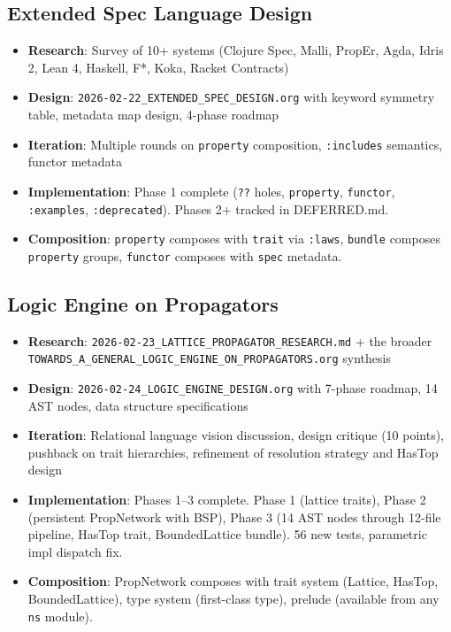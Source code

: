 \documentclass[11pt]{article}
\begin{document}
\subsection{Extended Spec Language Design}
\label{sec:orgdff6ff9}
\begin{itemize}
\item \textbf{Research}: Survey of 10+ systems (Clojure Spec, Malli, PropEr, Agda,
Idris 2, Lean 4, Haskell, F*, Koka, Racket Contracts)
\item \textbf{Design}: \texttt{2026-02-22\_EXTENDED\_SPEC\_DESIGN.org} with keyword symmetry
table, metadata map design, 4-phase roadmap
\item \textbf{Iteration}: Multiple rounds on \texttt{property} composition, \texttt{:includes}
semantics, functor metadata
\item \textbf{Implementation}: Phase 1 complete (\texttt{??} holes, \texttt{property}, \texttt{functor},
\texttt{:examples}, \texttt{:deprecated}). Phases 2+ tracked in DEFERRED.md.
\item \textbf{Composition}: \texttt{property} composes with \texttt{trait} via \texttt{:laws}, \texttt{bundle}
composes \texttt{property} groups, \texttt{functor} composes with \texttt{spec} metadata.
\end{itemize}
\subsection{Logic Engine on Propagators}
\label{sec:orge8fe517}
\begin{itemize}
\item \textbf{Research}: \texttt{2026-02-23\_LATTICE\_PROPAGATOR\_RESEARCH.md} + the broader
\texttt{TOWARDS\_A\_GENERAL\_LOGIC\_ENGINE\_ON\_PROPAGATORS.org} synthesis
\item \textbf{Design}: \texttt{2026-02-24\_LOGIC\_ENGINE\_DESIGN.org} with 7-phase roadmap,
14 AST nodes, data structure specifications
\item \textbf{Iteration}: Relational language vision discussion, design critique
(10 points), pushback on trait hierarchies, refinement of resolution
strategy and HasTop design
\item \textbf{Implementation}: Phases 1--3 complete. Phase 1 (lattice traits),
Phase 2 (persistent PropNetwork with BSP), Phase 3 (14 AST nodes
through 12-file pipeline, HasTop trait, BoundedLattice bundle).
56 new tests, parametric impl dispatch fix.
\item \textbf{Composition}: PropNetwork composes with trait system (Lattice, HasTop,
BoundedLattice), type system (first-class type), prelude (available
from any \texttt{ns} module).
\end{itemize}
\end{document}
